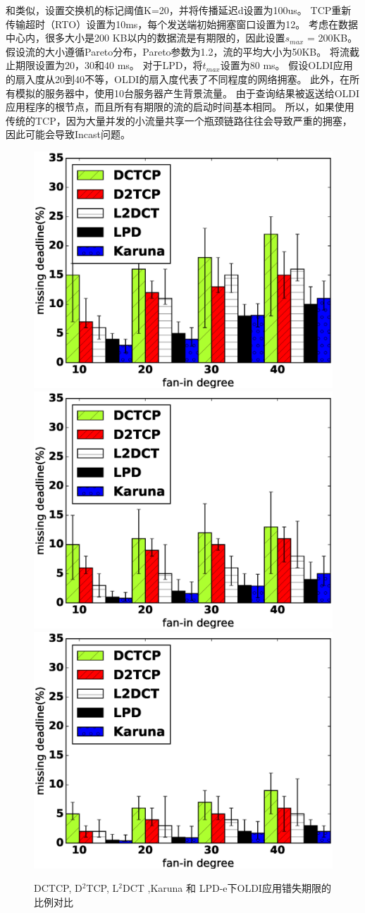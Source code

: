 和类似，设置交换机的标记阈值K=20，并将传播延迟d设置为100us。 
TCP重新传输超时（RTO）设置为10ms，每个发送端初始拥塞窗口设置为12。
考虑在数据中心内，很多大小是200 KB以内的数据流是有期限的，因此设置$s_{max}$ = 200KB。
假设流的大小遵循Pareto分布，Pareto参数为1.2，流的平均大小为50KB。
将流截止期限设置为20，30和40 ms。
对于LPD，将$t_{max}$设置为80 ms。
假设OLDI应用的扇入度从20到40不等，OLDI的扇入度代表了不同程度的网络拥塞。
此外，在所有模拟的服务器中，使用10台服务器产生背景流量。
由于查询结果被返送给OLDI应用程序的根节点，而且所有有期限的流的启动时间基本相同。
所以，如果使用传统的TCP，因为大量并发的小流量共享一个瓶颈链路往往会导致严重的拥塞，因此可能会导致Incast问题\cite{Incast08}。

\begin{figure}[h]
\centering
{}
 {\includegraphics[width=0.32\columnwidth]{figures/LPD/old/tight.eps}}
{\includegraphics[width=0.32\columnwidth]{figures/LPD/old/moderate.eps}}
{\includegraphics[width=0.32\columnwidth]{figures/LPD/old/lax.eps}}
\caption{DCTCP, D$^2$TCP, L$^2$DCT ,Karuna 和 LPD-e下OLDI应用错失期限的比例对比}
\label{Incast-dc-top-fig}
\end{figure}


